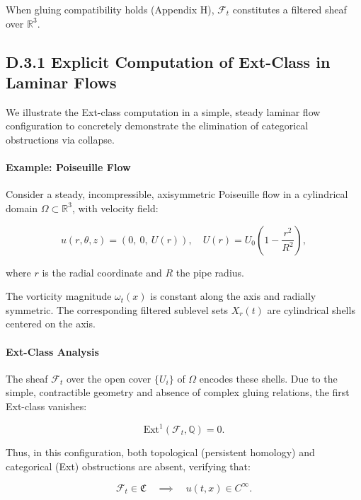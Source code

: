 \documentclass[11pt]{article}
\begin{document}
When gluing compatibility holds (Appendix H), \( \mathcal{F}_t \) constitutes a filtered sheaf over \( \mathbb{R}^3 \).

\subsection*{D.3.1 Explicit Computation of Ext-Class in Laminar Flows}

We illustrate the Ext-class computation in a simple, steady laminar flow configuration to concretely demonstrate the elimination of categorical obstructions via collapse.

\paragraph{Example: Poiseuille Flow}

Consider a steady, incompressible, axisymmetric Poiseuille flow in a cylindrical domain \( \Omega \subset \mathbb{R}^3 \), with velocity field:

\begin{equation}
u(r, \theta, z) = \left( 0,\ 0,\ U(r) \right), \quad U(r) = U_0 \left( 1 - \frac{r^2}{R^2} \right),
\end{equation}

where \( r \) is the radial coordinate and \( R \) the pipe radius.

The vorticity magnitude \( \omega_t(x) \) is constant along the axis and radially symmetric. The corresponding filtered sublevel sets \( X_r(t) \) are cylindrical shells centered on the axis.

\paragraph{Ext-Class Analysis}

The sheaf \( \mathcal{F}_t \) over the open cover \( \{ U_i \} \) of \( \Omega \) encodes these shells. Due to the simple, contractible geometry and absence of complex gluing relations, the first Ext-class vanishes:

\begin{equation}
\mathrm{Ext}^1(\mathcal{F}_t, \mathbb{Q}) = 0.
\end{equation}

Thus, in this configuration, both topological (persistent homology) and categorical (Ext) obstructions are absent, verifying that:

\begin{equation}
\mathcal{F}_t \in \mathfrak{C} \quad \implies \quad u(t,x) \in C^\infty.
\end{equation}
\end{document}
